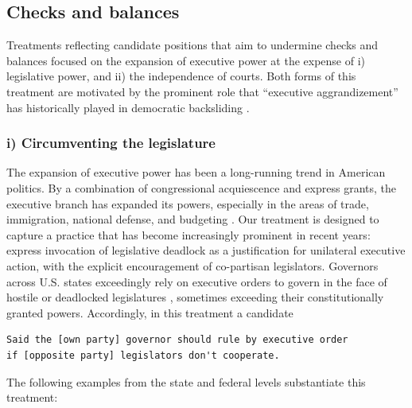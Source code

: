 \documentclass[12pt]{article}
\begin{document}
\subsection{Checks and balances}

Treatments reflecting candidate positions that aim to undermine checks and balances focused on the expansion of executive power at the expense of i) legislative power, and ii) the independence of courts. Both forms of this treatment are motivated by the prominent role that ``executive aggrandizement'' has historically played in democratic backsliding \citep{Bermeo2016}.

\subsubsection*{i) Circumventing the legislature}

The expansion of executive power has been a long-running trend in American politics. By a combination of congressional acquiescence and express grants, the executive branch has expanded its powers, especially in the areas of trade, immigration, national defense, and budgeting \citep{Howell2003,PosnerVermeule2010}. Our treatment is designed to capture a practice that has become increasingly prominent in recent years: express invocation of legislative deadlock as a justification for unilateral executive action, with the explicit encouragement of co-partisan legislators. Governors across U.S. states exceedingly rely on executive orders to govern in the face of hostile or deadlocked legislatures \citep{BarberBoltonThrowerForthcoming,CockerhamJr.2017}, sometimes exceeding their constitutionally granted powers. Accordingly, in this treatment a candidate
\begin{center}
\begin{varwidth}{\linewidth}
\begin{verbatim}
Said the [own party] governor should rule by executive order
if [opposite party] legislators don't cooperate.
\end{verbatim}
\end{varwidth}
\end{center}

The following examples from the state and federal levels substantiate this treatment:
\end{document}
